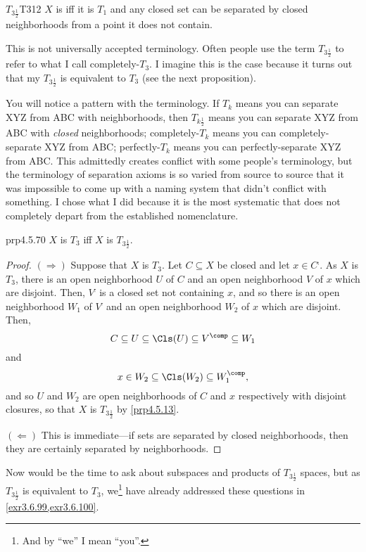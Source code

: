 \begin{dfn}{$T_{3\frac{1}{2}}$}{T312}
$X$ is  iff it is $T_1$ and any closed set can be separated by closed neighborhoods from a point it does not contain.
\begin{rmk}
This is not universally accepted terminology.  Often people use the term $T_{3\frac{1}{2}}$ to refer to what I call completely-$T_3$.  I imagine this is the case because it turns out that my $T_{3\frac{1}{2}}$ is equivalent to $T_3$ (see the next proposition).
\end{rmk}
\begin{rmk}
You will notice a pattern with the terminology.  If $T_k$ means you can separate XYZ from ABC with neighborhoods, then $T_{k\frac{1}{2}}$ means you can separate XYZ from ABC with \emph{closed} neighborhoods; completely-$T_k$ means you can completely-separate XYZ from ABC; perfectly-$T_k$ means you can perfectly-separate XYZ from ABC.  This admittedly creates conflict with some people's terminology, but the terminology of separation axioms is so varied from source to source that it was impossible to come up with a naming system that didn't conflict with something.  I chose what I did because it is the most systematic that does not completely depart from the established nomenclature.
\end{rmk}
\end{dfn}
\begin{prp}{}{prp4.5.70}
$X$ is $T_3$ iff $X$ is $T_{3\frac{1}{2}}$.
\begin{proof}
$(\Rightarrow )$ Suppose that $X$ is $T_3$.  Let $C\subseteq X$ be closed and let $x\in C^{\comp}$.  As $X$ is $T_3$, there is an open neighborhood $U$ of $C$ and an open neighborhood $V$ of $x$ which are disjoint.  Then, $V^{\comp}$ is a closed set not containing $x$, and so there is an open neighborhood $W_1$ of $V^{\comp}$ and an open neighborhood $W_2$ of $x$ which are disjoint.  Then,
\begin{equation}
C\subseteq U\subseteq \Cls (U)\subseteq V^{\comp}\subseteq W_1
\end{equation}
and
\begin{equation}
x\in W_2\subseteq \Cls (W_2)\subseteq W_1^{\comp},
\end{equation}
and so $U$ and $W_2$ are open neighborhoods of $C$ and $x$ respectively with disjoint closures, so that $X$ is $T_{3\frac{1}{2}}$ by \cref{prp4.5.13}.

\blankline
\noindent
$(\Leftarrow )$ This is immediate---if sets are separated by closed neighborhoods, then they are certainly separated by neighborhoods.
\end{proof}
\end{prp}
Now would be the time to ask about subspaces and products of $T_{3\frac{1}{2}}$ spaces, but as $T_{3\frac{1}{2}}$ is equivalent to $T_3$, we\footnote{And by ``we'' I mean ``you''.} have already addressed these questions in \cref{exr3.6.99,exr3.6.100}.


